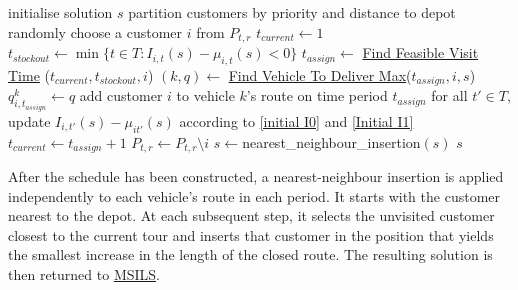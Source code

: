 \documentclass{article}
\begin{document}
\begin{algorithm}[H]
\captionsetup{labelformat=empty}
\caption{\textbf{Construct Initial Solution}}
\label{alg:InitialSchedule}
\begin{algorithmic}[1]
\STATE initialise solution $s$ \label{Initialise s} 
\STATE partition customers by priority and distance to depot
        \STATE randomly choose a customer $i$ from $P_{t,r}$
        \STATE $t_{current}\gets 1$
            \STATE $t_{stockout}\gets \min\{t\in T: I_{i,t}(s)-\mu_{i,t}(s) <0\}$
            \STATE $t_{assign}\gets$ \hyperref[alg:FindVisitTime]{Find Feasible Visit Time} ($t_{current}, t_{stockout}, i$)
            \STATE $(k,q)\gets $ \hyperref[alg:FindVehicleToDeliverMax]{Find Vehicle To Deliver Max}($t_{assign}, i, s$)            
            \STATE $q^k_{i,t_{assign}}\gets q$
            \STATE add customer $i$ to vehicle $k$'s route on time period $t_{assign}$
            \STATE for all $t'\in T$, update $I_{i,t'}(s)- \mu_{it'}(s) $ according to \eqref{initial I0} and \eqref{Initial I1} 
            \STATE $t_{current}\gets t_{assign}+1$
        \ENDWHILE
        \STATE $P_{t,r}\gets P_{t,r}\setminus i$
    \ENDWHILE
\ENDFOR
\STATE $s\gets $nearest\_neighbour\_insertion$(s)$
\RETURN $s$ 
\end{algorithmic}
\end{algorithm}


After the schedule has been constructed, a nearest-neighbour insertion \cite{braysy2005vehicle} is applied independently to each vehicle's route in each period. It starts with the customer nearest to the depot. At each subsequent step, it selects the unvisited customer closest to the current tour and inserts that customer in the position that yields the smallest increase in the length of the closed route. The resulting solution is then returned to \hyperref[alg:MSILS]{MSILS}.






\end{document}
